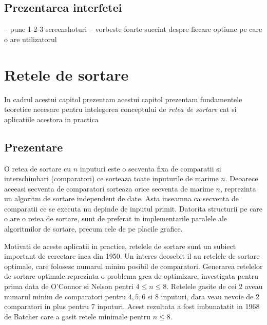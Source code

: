 \documentclass[12pt]{article}
\begin{document}
\subsection{Prezentarea interfetei}

-- pune 1-2-3 screenshoturi
-- vorbeste foarte succint despre fiecare optiune pe care o are utilizatorul

\section{Retele de sortare}

In cadrul acestui capitol prezentam acestui capitol prezentam fundamentele teoretice necesare pentru intelegerea conceptului de \textit{retea de sortare} cat si aplicatiile acestora in practica

\subsection{Prezentare}

O retea de sortare cu $n$ inputuri este o secventa fixa de comparatii si interschimbari (comparatori) ce sorteaza toate inputurile de marime $n$. Deoarece aceeasi secventa de comparatori sorteaza orice secventa de marime $n$, reprezinta un algoritm de sortare independent de date. Asta inseamna ca secventa de comparatii ce se executa nu depinde de inputul primit. Datorita structurii pe care o are o retea de sortare, sunt de preferat in implementarile paralele ale algoritmilor de sortare, precum cele de pe placile grafice.

Motivati de aceste aplicatii in practice, retelele de sortare sunt un subiect important de cercetare inca din 1950. Un interes deosebit il au retelele de sortare optimale, care folosesc numarul minim posibil de comparatori. Generarea retelelor de sortare optimale reprezinta o problema grea de optimizare, investigata pentru prima data de O'Connor si Nelson pentri $4 \leq n \leq 8$. Retelele gasite de cei 2 aveau numarul minim de comparatori pentru $4, 5, 6$ si $8$ inputuri, dara veau nevoie de 2 comparatori in plus pentru $7$ inputuri. Acest rezultata a fost imbunatatit in 1968 de Batcher care a gasit retele minimale pentru $n \leq 8$.
\end{document}
